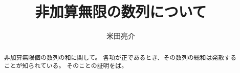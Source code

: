 \documentclass{jsarticle}
\begin{document}
\title{非加算無限の数列について}
\author{米田亮介}
\maketitle	

\begin{abstract}
非加算無限個の数列の和に関して。
各項が正であるとき、その数列の総和は発散することが知られている。
そのことの証明をば。
\end{abstract}
\end{document}
